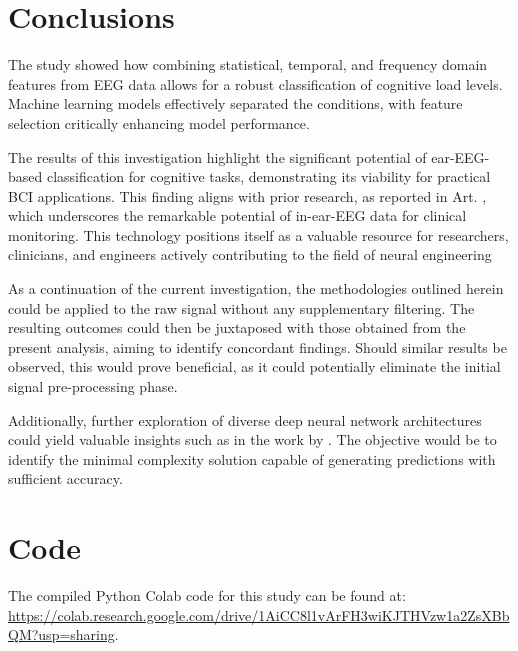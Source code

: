 \documentclass[conference]{IEEEtran}
\begin{document}
\newpage
\vspace{2mm}
\section{Conclusions}
\vspace{2mm}

The study showed how combining statistical, temporal, and frequency domain features from EEG data allows for a robust classification of cognitive load levels. Machine learning models effectively separated the conditions, with feature selection critically enhancing model performance.

The results of this investigation highlight the significant potential of ear-EEG-based classification for cognitive tasks, demonstrating its viability for practical BCI applications. This finding aligns with prior research, as reported in Art. \cite{Kaongoen_2023}, which underscores the remarkable potential of in-ear-EEG data for clinical monitoring.  This technology positions itself as a valuable resource for researchers, clinicians, and engineers actively contributing to the field of neural engineering

As a continuation of the current investigation, the methodologies outlined herein could be applied to the raw signal without any supplementary filtering. The resulting outcomes could then be juxtaposed with those obtained from the present analysis, aiming to identify concordant findings. Should similar results be observed, this would prove beneficial, as it could potentially eliminate the initial signal pre-processing phase. 

Additionally, further exploration of diverse deep neural network architectures could yield valuable insights such as in the work by \cite{9061644}. The objective would be to identify the minimal complexity solution capable of generating predictions with sufficient accuracy.


\vspace{2mm}
\section{Code}
\vspace{2mm}

The compiled Python Colab code for this study can be found at:
\url{https://colab.research.google.com/drive/1AiCC8l1vArFH3wiKJTHVzw1a2ZsXBbQM?usp=sharing}.



\end{document}

